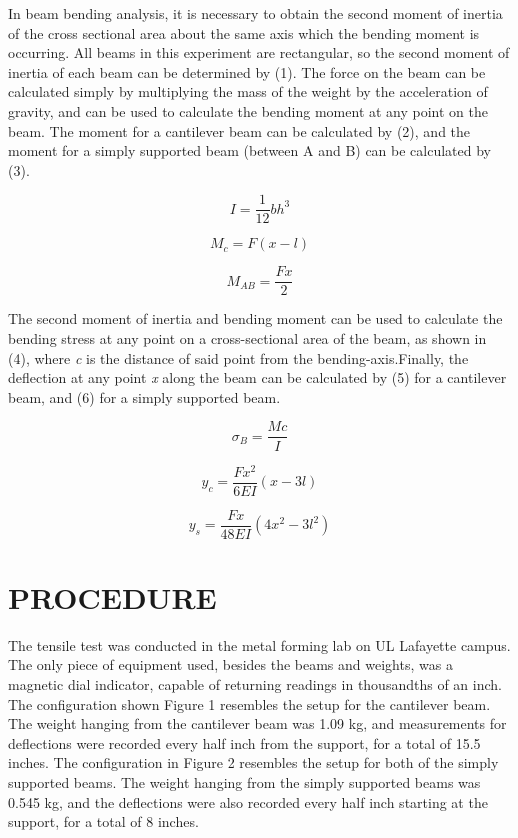 \documentclass[12pt]{article}
\begin{document}
In beam bending analysis, it is necessary to obtain the second moment of inertia of the cross sectional area about the same axis which the bending moment is occurring. All beams in this experiment are rectangular, so the second moment of inertia of each beam can be determined by (1). The force on the beam can be calculated simply by multiplying the mass of the weight by the acceleration of gravity, and can be used to calculate the bending moment at any point on the beam. The moment for a cantilever beam can be calculated by (2), and the moment for a simply supported beam (between A and B) can be calculated by (3).
\bigskip

\begin{equation}
I = \frac{1}{12}bh^3
\end{equation}

\bigskip
\begin{equation}
M_{c} = F(x-l)
\end{equation}

\bigskip
\begin{equation}
M_{AB} = \frac{Fx}{2}
\end{equation}
\bigskip

The second moment of inertia and bending moment can be used to calculate the bending stress at any point on a cross-sectional area of the beam, as shown in (4), where \emph{c} is the distance of said point from the bending-axis.Finally, the deflection at any point \emph{x} along the beam can be calculated by (5) for a cantilever beam, and (6) for a simply supported beam.
\bigskip

\begin{equation}
\sigma_{B} = \frac {Mc}{I}
\end{equation}

\bigskip
\begin{equation}
y_{c} = \frac{Fx^2}{6EI}(x-3l)
\end{equation}

\bigskip
\begin{equation}
y_{s} = \frac{Fx}{48EI}(4x^2-3l^2)
\end{equation}
\bigskip



\section*{\fontsize{12}{12}\selectfont PROCEDURE}
The tensile test was conducted in the metal forming lab on UL Lafayette campus. The only piece of equipment used, besides the beams and weights, was a magnetic dial indicator, capable of returning readings in thousandths of an inch. The configuration shown Figure 1 resembles the setup for the cantilever beam. The weight hanging from the cantilever beam was 1.09 kg, and measurements for deflections were recorded every half inch from the support, for a total of 15.5 inches. The configuration in Figure 2 resembles the setup for both of the simply supported beams. The weight hanging from the simply supported beams was 0.545 kg, and the deflections were also recorded every half inch starting at the support, for a total of 8 inches.
\bigskip
\end{document}
